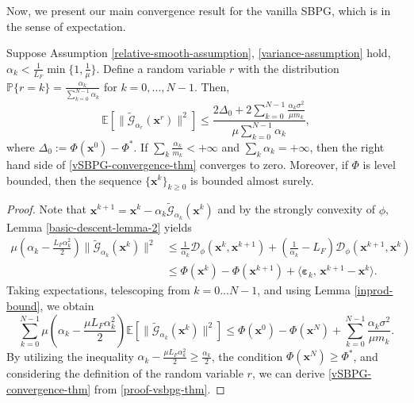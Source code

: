 \documentclass[twoside,11pt]{article}
\newcommand{\be}{\begin{equation}}
\newcommand{\ee}{\end{equation}}
\newcommand{\E}{\mathbb{E}}
\newcommand{\cD}{\mathcal D}
\newcommand{\cG}{\mathcal G}
\def\inprod#1#2{\langle#1,\,#2\rangle}
\def\vx{{\bm{x}}}
\begin{document}
Now, we present our main convergence result for the vanilla SBPG, which is in the sense of expectation.
\begin{theorem}
  Suppose Assumption \ref{relative-smooth-assumption}, \ref{variance-assumption} hold, $\alpha_k<\frac{1}{L_F}\min\{1,\frac{1}{\mu}\}$. Define a random variable $r$ with the distribution $\mathbb{P}\{r=k\}=\frac{\alpha_k}{\sum_{k=0}^{N-1}\alpha_k}$ for $k=0,...,N-1$. Then,
\be\label{vSBPG-convergence-thm}
 \E[\|\widetilde{\mathcal G}_{\alpha_r}(\vx^{r})\|^2]\leq\frac{2\Delta_0+2\sum_{k=0}^{N-1}\frac{\alpha_k\sigma^2}{\mu m_k}}{\mu\sum_{k=0}^{N-1}\alpha_k},
\ee
  where $\Delta_0:=\Phi(\vx^0)-\Phi^*$. If $\sum_{k}\frac{\alpha_k}{m_k}<+\infty$ and $\sum_{k}\alpha_k=+\infty$, then the right hand side of \eqref{vSBPG-convergence-thm} converges to zero. Moreover, if $\Phi$ is level bounded, then the sequence $\{{\vx^k}\}_{k\geq0}$ is bounded almost surely.
 \label{converge-thm-vanilla-expt}
\end{theorem}
\begin{proof}
    Note that ${\vx^{k+1}}={\vx^k}-\alpha_k\widetilde{\cG}_{\alpha_k}({\vx^k})$ and by the strongly convexity of $\phi$, Lemma \ref{basic-descent-lemma-2} yields 
\[
\begin{aligned}
    \mu(\alpha_k-\frac{L_F\alpha_k^2}{2})\|\widetilde{\cG}_{\alpha_k}({\vx^k})\|^2&\leq\frac{1}{\alpha_k}\cD_\phi({\vx^k},{\vx^{k+1}})+\left(\frac{1}{\alpha_k}-L_F\right)\cD_\phi({\vx^{k+1}},{\vx^k})\\
    &\leq\Phi({\vx^k})-\Phi({\vx^{k+1}})+\inprod{{\bm\varepsilon}_k}{{\vx^{k+1}}-{\vx^k}}.
\end{aligned}
\]
Taking expectations, telescoping from $k=0...N-1$, and using Lemma \ref{inprod-bound}, we obtain
\be
 \sum_{k=0}^{N-1}\mu(\alpha_k-\frac{\mu L_F\alpha_k^2}{2})\E[\|\widetilde{\mathcal G}_{\alpha_k}({\vx^k})\|^2]\leq\Phi(\vx^0)-\Phi(\vx^N)+\sum_{k=0}^{N-1}\frac{\alpha_k\sigma^2}{\mu m_k}.
 \label{proof-vsbpg-thm}
\ee
By utilizing the inequality $\alpha_k - \frac{\mu L_F \alpha_k^2}{2} \geq \frac{\alpha_k}{2}$, the condition $\Phi(\vx^N) \geq \Phi^*$, and considering the definition of the random variable $r$, we can derive \eqref{vSBPG-convergence-thm} from \eqref{proof-vsbpg-thm}. 
\end{proof}
\end{document}
